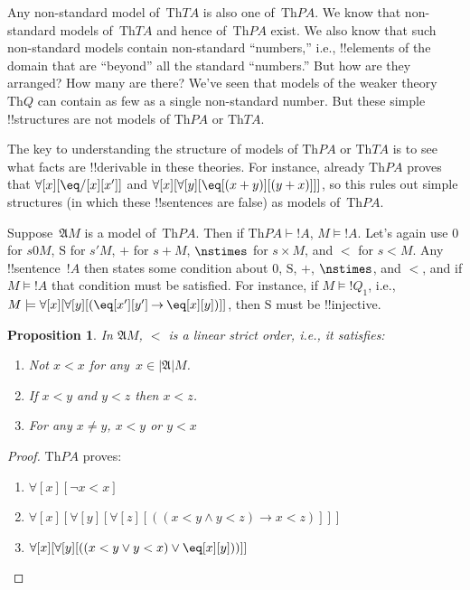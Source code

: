 \documentclass[10pt,a4paper]{article}
\theoremstyle{plain}
\newtheorem{prop}[thm]{Proposition}
\theoremstyle{definition}
\theoremstyle{remark}
\newenvironment{explain}{}{}
\providecommand{\lif}{\mathbin{\rightarrow}}
\providecommand{\lforall}{\mathord{\forall}}
\providecommand{\Proves}{\mathrel{\vdash}}
\providecommand{\Obj}{}
\providecommand{\Struct}{\ensuremath{\mathfrak{A}}}
\providecommand{\Domain}{\ensuremath{|\mathfrak{A}|}}
\providecommand{\Assign}{\ensuremath{s}}
\providecommand{\Sat}[2]{\ensuremath{#1 \models #2}}
\providecommand{\Th}{\ensuremath{\mathrm{Th}}}
\providecommand{\nszero}{\mathrm{0}}
\providecommand{\nssucc}{\mathrm{S}}
\providecommand{\nsplus}{\mathbin{+}}
\providecommand{\nsless}{<}
\begin{document}
\begin{explain}
Any non-standard model of~$\Th{TA}$ is also one of~$\Th{PA}$. We know
that non-standard models of~$\Th{TA}$ and hence of~$\Th{PA}$ exist. We
also know that such non-standard models contain non-standard
``numbers,'' i.e., !!{element}s of the domain that are ``beyond'' all
the standard ``numbers.''  But how are they arranged? How many are
there? We've seen that models of the weaker theory~$\Th{Q}$ can
contain as few as a single non-standard number. But these simple
!!{structure}s are not models of $\Th{PA}$ or $\Th{TA}$.

The key to understanding the structure of models of $\Th{PA}$ or
$\Th{TA}$ is to see what facts are !!{derivable} in these theories.
For instance, already $\Th{PA}$ proves that $\lforall[x][\eq/[x][x']]$
and $\lforall[x][\lforall[y][\eq[(x+y)][(y+x)]]]$, so this rules out
simple structures (in which these !!{sentence}s are false) as models
of~$\Th{PA}$.

Suppose~$\Struct{M}$ is a model of~$\Th{PA}$. Then if $\Th{PA} \Proves
!A$, $\Sat{M}{!A}$.  Let's again use $\nszero$ for
$\Assign{\Obj{0}}{M}$, $\nssucc$ for $\Assign{\prime}{M}$, $\nsplus$
for $\Assign{+}{M}$, $\nstimes$ for $\Assign{\times}{M}$, and
$\nsless$ for $\Assign{<}{M}$. Any !!{sentence}~$!A$ then states some
condition about $\nszero$, $\nssucc$, $\nsplus$, $\nstimes$, and
$\nsless$, and if $\Sat{M}{!A}$ that condition must be satisfied. For
instance, if $\Sat{M}{!Q_1}$, i.e.,
$\Sat{M}{\lforall[x][\lforall[y][(\eq[x'][y'] \lif \eq[x][y])]]}$,
then $\nssucc$ must be !!{injective}.
\end{explain}

\begin{prop}
In $\Struct{M}$, $\nsless$ is a linear strict order, i.e., it
satisfies:
\begin{enumerate}
\item Not $x \nsless x$ for any~$x \in \Domain{M}$.
\item If $x \nsless y$ and $y \nsless z$ then $x \nsless z$.
\item For any $x \neq y$, $x \nsless y$ or $y \nsless x$
\end{enumerate}
\end{prop}

\begin{proof}
$\Th{PA}$ proves:
\begin{enumerate}
\item $\lforall[x][\lnot x < x]$
\item $\lforall[x][\lforall[y][\lforall[z][((x < y \land y < z) \lif x < z)]]]$
\item $\lforall[x][\lforall[y][((x < y \lor y < x) \lor \eq[x][y]))]]$
\end{enumerate}
\end{proof}
\end{document}
